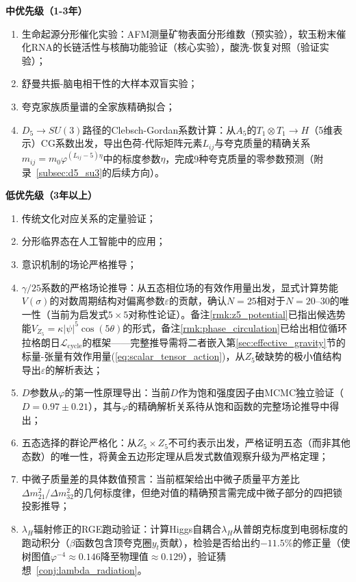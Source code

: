 \documentclass[12pt,a4paper,twocolumn]{article}
\renewcommand{\phi}{\varphi}
\begin{document}
\textbf{中优先级（1-3年）}
\begin{enumerate}
\item 生命起源分形催化实验：AFM测量矿物表面分形维数（预实验），软玉粉末催化RNA的长链活性与核酶功能验证（核心实验），酸洗-恢复对照（验证实验）；
\item 舒曼共振-脑电相干性的大样本双盲实验；
\item 夸克家族质量谱的全家族精确拟合；
\item $D_5\to SU(3)$路径的Clebsch-Gordan系数计算：从$A_5$的$T_1\otimes T_1\to H$（5维表示）CG系数出发，导出色荷-代际矩阵元素$L_{ij}$与夸克质量的精确关系$m_{ij}=m_0\phi^{(L_{ij}-5)\eta}$中的标度参数$\eta$，完成9种夸克质量的零参数预测（附录~\ref{subsec:d5_su3}的后续方向）。
\end{enumerate}

\textbf{低优先级（3年以上）}
\begin{enumerate}
\item 传统文化对应关系的定量验证；
\item 分形临界态在人工智能中的应用；
\item 意识机制的场论严格推导；
\item $\gamma/25$系数的严格场论推导：从五态相位场的有效作用量出发，显式计算势能$V(\sigma)$的对数周期结构对偏离参数$\varepsilon$的贡献，确认$N=25$相对于$N=20$--$30$的唯一性（当前为启发式$5\times 5$对称性论证）。备注\ref{rmk:z5_potential}已指出候选势能$V_{Z_5} = \kappa|\psi|^5\cos(5\theta)$的形式，备注\ref{rmk:phase_circulation}已给出相位循环拉格朗日$\mathcal{L}_{\text{cycle}}$的框架——完整推导需将二者嵌入第\ref{sec:effective_gravity}节的标量-张量有效作用量(\ref{eq:scalar_tensor_action})，从$Z_5$破缺势的极小值结构导出$\varepsilon$的解析表达；
\item $D$参数从$\phi$的第一性原理导出：当前$D$作为饱和强度因子由MCMC独立验证（$D=0.97\pm0.21$），其与$\phi$的精确解析关系待从饱和函数的完整场论推导中得出；
\item 五态选择的群论严格化：从$Z_5 \times Z_5$不可约表示出发，严格证明五态（而非其他态数）的唯一性，将黄金五边形定理从启发式数值观察升级为严格定理；
\item 中微子质量差的具体数值预言：当前框架给出中微子质量平方差比$\Delta m^2_{21}/\Delta m^2_{32}$的几何标度律，但绝对值的精确预言需完成中微子部分的四把锁投影推导；
\item $\lambda_H$辐射修正的RGE跑动验证：计算Higgs自耦合$\lambda_H$从普朗克标度到电弱标度的跑动积分（$\beta$函数包含顶夸克圈$y_t$贡献），检验是否给出约$-11.5\%$的修正量（使树图值$\phi^{-4}\approx0.146$降至物理值$\approx0.129$），验证猜想~\ref{conj:lambda_radiation}。
\end{enumerate}
\end{document}

